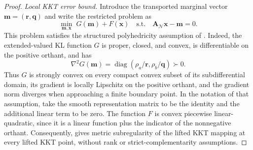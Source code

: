 \begin{proof}

\textit{Local KKT error bound.}
\label{app:pduot-sharpness}
Introduce the transported marginal vector $\mathbf m=(\mathbf r,\mathbf q)$ and write the restricted problem as
\begin{equation*}
\min_{\mathbf m,\mathbf x}\;G(\mathbf m)+F(\mathbf x)\quad\text{s.t.}\quad\mathbf A_{\mathcal N}\mathbf x-\mathbf m=0.
\end{equation*}
This problem satisfies the structured polyhedricity assumption of \citet[Assumptions~1.2--1.3]{yuan2020discerning}.
Indeed, the extended-valued KL function $G$ is proper, closed, and convex, is differentiable on the positive orthant, and has
\begin{equation*}
\nabla^2G(\mathbf m)=\operatorname{diag}(\rho_a/\mathbf r,\rho_b/\mathbf q)\succ0.
\end{equation*}
Thus $G$ is strongly convex on every compact convex subset of its subdifferential domain, its gradient is locally Lipschitz on the positive orthant, and the gradient norm diverges when approaching a finite boundary point.
In the notation of that assumption, take the smooth representation matrix to be the identity and the additional linear term to be zero.
The function $F$ is convex piecewise linear-quadratic, since it is a linear function plus the indicator of the nonnegative orthant.
Consequently, \citet[Theorem~59]{yuan2020discerning} gives metric subregularity of the lifted KKT mapping at every lifted KKT point, without rank or strict-complementarity assumptions.


\end{proof}
